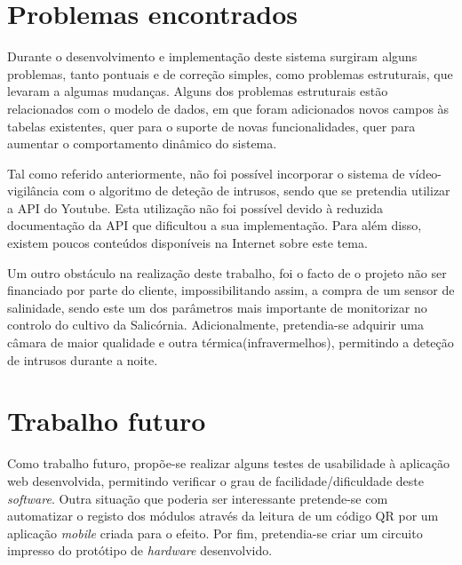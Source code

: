 \section{Problemas encontrados}


Durante o desenvolvimento e implementação deste sistema surgiram alguns problemas, tanto pontuais e de correção simples, como
problemas estruturais, que levaram a algumas mudanças. Alguns dos problemas estruturais estão relacionados com o modelo de dados, em que foram adicionados novos campos às tabelas existentes, quer para o suporte de novas funcionalidades, quer para aumentar o comportamento dinâmico do sistema.

Tal como referido anteriormente, não foi possível incorporar o sistema de vídeo-vigilância com o algoritmo de deteção de intrusos, sendo que se pretendia utilizar a \ac{API} do Youtube. Esta utilização não foi possível devido à reduzida documentação da API que dificultou a sua implementação. Para além disso, existem poucos conteúdos disponíveis na Internet sobre este tema. 




Um outro obstáculo na realização deste trabalho, foi o facto de o projeto não ser financiado por parte do cliente, impossibilitando assim, a compra de um sensor de salinidade, sendo este um dos parâmetros mais importante de monitorizar no controlo do cultivo da Salicórnia. Adicionalmente, pretendia-se adquirir uma câmara de maior qualidade e outra térmica(infravermelhos), permitindo a deteção de intrusos durante a noite. 










\section{Trabalho futuro}



Como trabalho futuro, propõe-se realizar alguns testes de usabilidade à aplicação web desenvolvida, permitindo verificar o grau de facilidade/dificuldade deste \textit{software}. Outra situação que poderia ser interessante pretende-se com automatizar o registo dos módulos através da leitura de um código \ac{QR} por um aplicação \textit{mobile} criada para o efeito. Por fim, pretendia-se criar um circuito impresso do protótipo de \textit{hardware} desenvolvido. 











 

